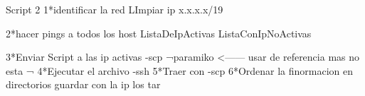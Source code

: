 Script 2
1*identificar la red 
    LImpiar ip
    x.x.x.x/19

2*hacer pings a todos los host
    ListaDeIpActivas
    ListaConIpNoActivas

3*Enviar Script a las ip activas
    -scp
        ¬paramiko <------ usar de referencia mas no esta
        ¬
4*Ejecutar el archivo
    -ssh
5*Traer con 
    -scp
6*Ordenar la finormacion en directorios
    guardar con la ip los tar